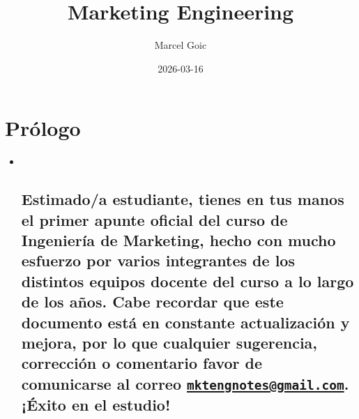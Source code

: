 \documentclass[
]{book}
\title{Marketing Engineering}
\author{Marcel Goic}
\date{2026-03-16}
\begin{document}
\maketitle

{
\setcounter{tocdepth}{1}
\tableofcontents
}
\hypertarget{pruxf3logo}{%
\chapter*{Prólogo}\label{pruxf3logo}}

\begin{itemize}
\item ~
  \hypertarget{estimadoa-estudiante-tienes-en-tus-manos-el-primer-apunte-oficial-del-curso-de-ingenieruxeda-de-marketing-hecho-con-mucho-esfuerzo-por-varios-integrantes-de-los-distintos-equipos-docente-del-curso-a-lo-largo-de-los-auxf1os.-cabe-recordar-que-este-documento-estuxe1-en-constante-actualizaciuxf3n-y-mejora-por-lo-que-cualquier-sugerencia-correcciuxf3n-o-comentario-favor-de-comunicarse-al-correo-mktengnotesgmail.com.-uxe9xito-en-el-estudio}{%
  \section{\texorpdfstring{Estimado/a estudiante, tienes en tus manos el primer apunte oficial del curso de Ingeniería de Marketing, hecho con mucho esfuerzo por varios integrantes de los distintos equipos docente del curso a lo largo de los años. Cabe recordar que este documento está en constante actualización y mejora, por lo que cualquier sugerencia, corrección o comentario favor de comunicarse al correo \href{mailto:mktengnotes@gmail.com}{\nolinkurl{mktengnotes@gmail.com}}. ¡Éxito en el estudio!}{Estimado/a estudiante, tienes en tus manos el primer apunte oficial del curso de Ingeniería de Marketing, hecho con mucho esfuerzo por varios integrantes de los distintos equipos docente del curso a lo largo de los años. Cabe recordar que este documento está en constante actualización y mejora, por lo que cualquier sugerencia, corrección o comentario favor de comunicarse al correo mktengnotes@gmail.com. ¡Éxito en el estudio!}}\label{estimadoa-estudiante-tienes-en-tus-manos-el-primer-apunte-oficial-del-curso-de-ingenieruxeda-de-marketing-hecho-con-mucho-esfuerzo-por-varios-integrantes-de-los-distintos-equipos-docente-del-curso-a-lo-largo-de-los-auxf1os.-cabe-recordar-que-este-documento-estuxe1-en-constante-actualizaciuxf3n-y-mejora-por-lo-que-cualquier-sugerencia-correcciuxf3n-o-comentario-favor-de-comunicarse-al-correo-mktengnotesgmail.com.-uxe9xito-en-el-estudio}}
\end{itemize}
\end{document}
